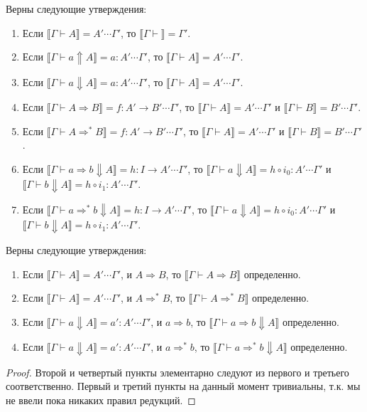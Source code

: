 \documentclass{amsart}
\theoremstyle{definition}
\theoremstyle{remark}
\newcommand{\red}{\Rightarrow}
\renewcommand{\ll}{\llbracket}
\newcommand{\rr}{\rrbracket}
\numberwithin{figure}{section}
\begin{document}
\begin{lem}
Верны следующие утверждения:
\begin{enumerate}
\item Если $\ll \Gamma \vdash A \rr = A' \dotsb \Gamma'$, то $\ll \Gamma \vdash \rr = \Gamma'$.
\item Если $\ll \Gamma \vdash a \Uparrow A \rr = a : A' \dotsb \Gamma'$, то $\ll \Gamma \vdash A \rr = A' \dotsb \Gamma'$.
\item Если $\ll \Gamma \vdash a \Downarrow A \rr = a : A' \dotsb \Gamma'$, то $\ll \Gamma \vdash A \rr = A' \dotsb \Gamma'$.
\item Если $\ll \Gamma \vdash A \red B \rr = f : A' \to B' \dotsb \Gamma'$, то $\ll \Gamma \vdash A \rr = A' \dotsb \Gamma'$ и $\ll \Gamma \vdash B \rr = B' \dotsb \Gamma'$.
\item Если $\ll \Gamma \vdash A \red^* B \rr = f : A' \to B' \dotsb \Gamma'$, то $\ll \Gamma \vdash A \rr = A' \dotsb \Gamma'$ и $\ll \Gamma \vdash B \rr = B' \dotsb \Gamma'$.
\item Если $\ll \Gamma \vdash a \red b \Downarrow A \rr = h : I \to A' \dotsb \Gamma'$, то $\ll \Gamma \vdash a \Downarrow A \rr = h \circ i_0 : A' \dotsb \Gamma'$ и $\ll \Gamma \vdash b \Downarrow A \rr = h \circ i_1 : A' \dotsb \Gamma'$.
\item Если $\ll \Gamma \vdash a \red^* b \Downarrow A \rr = h : I \to A' \dotsb \Gamma'$, то $\ll \Gamma \vdash a \Downarrow A \rr = h \circ i_0 : A' \dotsb \Gamma'$ и $\ll \Gamma \vdash b \Downarrow A \rr = h \circ i_1 : A' \dotsb \Gamma'$.
\end{enumerate}
\end{lem}

\begin{lem}
Верны следующие утверждения:
\begin{enumerate}
\item Если $\ll \Gamma \vdash A \rr = A' \dotsb \Gamma'$, и $A \red B$, то $\ll \Gamma \vdash A \red B \rr$ определенно.
\item Если $\ll \Gamma \vdash A \rr = A' \dotsb \Gamma'$, и $A \red^* B$, то $\ll \Gamma \vdash A \red^* B \rr$ определенно.
\item Если $\ll \Gamma \vdash a \Downarrow A \rr = a' : A' \dotsb \Gamma'$, и $a \red b$, то $\ll \Gamma \vdash a \red b \Downarrow A \rr$ определенно.
\item Если $\ll \Gamma \vdash a \Downarrow A \rr = a' : A' \dotsb \Gamma'$, и $a \red^* b$, то $\ll \Gamma \vdash a \red^* b \Downarrow A \rr$ определенно.
\end{enumerate}
\end{lem}
\begin{proof}
Второй и четвертый пункты элементарно следуют из первого и третьего соответственно.
Первый и третий пункты на данный момент тривиальны, т.к. мы не ввели пока никаких правил редукций.
\end{proof}
\end{document}
